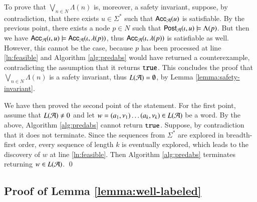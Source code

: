 \documentclass[10pt,conference,letterpaper,twocolumn]{IEEEtran}
\begin{document}
{  To prove that $\bigvee_{n \in N} \Lambda(n)$ is, moreover, a safety
  invariant, suppose, by contradiction, that there exists $u \in
  \Sigma^*$ such that $\mathsf{Acc}_{\mathcal{A}}(u)$ is satisfiable. By the previous
  point, there exists a node $p \in N$ such that $\mathsf{Post}_{\mathcal{A}}(\iota,u)
  \models \Lambda(p)$. But then we have $\mathsf{Acc}_{\mathcal{A}}(\iota,u) \models
  \mathsf{Acc}_{\mathcal{A}}(\iota,\lambda(p))$, thus $\mathsf{Acc}_{\mathcal{A}}(\iota,\lambda(p))$
  is satisfiable as well. However, this cannot be the case, because
  $p$ has been processed at line \ref{ln:feasible} and Algorithm
  \ref{alg:predabs} would have returned a counterexample,
  contradicting the assumption that it returns $\mathtt{true}$. This concludes
  the proof that $\bigvee_{n\in N} \Lambda(n)$ is a safety invariant,
  thus $L(\mathcal{A}) = \emptyset$, by Lemma \ref{lemma:safety-invariant}.

  We have then proved the second point of the statement. For the first
  point, assume that $L(\mathcal{A}) \neq 0$ and let $w = (a_1,\nu_1) \ldots
  (a_k,\nu_k) \in L(\mathcal{A})$ be a word. By the above, Algorithm
  \ref{alg:predabs} cannot return $\mathtt{true}$. Suppose, by contradiction
  that it does not terminate. Since the sequences from $\Sigma^*$ are
  explored in breadth-first order, every sequence of length $k$ is
  eventually explored, which leads to the discovery of $w$ at line
  \ref{ln:feasible}. Then Algorithm \ref{alg:predabs} terminates
  returning $w \in L(\mathcal{A})$. \qed}

\subsection{Proof of Lemma \ref{lemma:well-labeled}}

\end{document}
